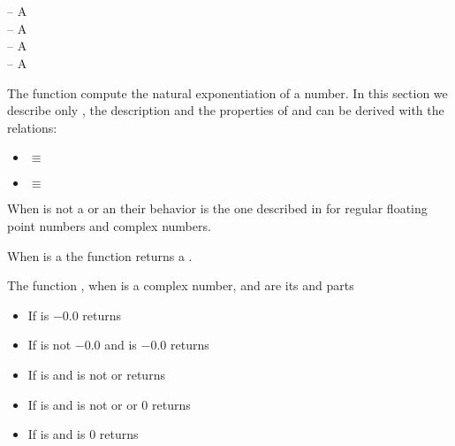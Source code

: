 \documentclass[../Exponentials-Logarithms-Trigonometry.tex]{subfiles}
\begin{document}

\DSyntax{}

  \RArrow {}\\
   \RArrow {}\\
  \RArrow {}

\DArgsNValues{}

 -- A \\
 -- A \\
 -- A \\
 -- A 

\DDescription{}

The function  compute the natural exponentiation of a number. In
this section we describe only , the description and the properties
of  and  can be derived with the relations:
\begin{itemize}
\item {}  \code{)} $\equiv$ 
  \code{)}  \code{))}
\item {} \code{)} $\equiv$  
  \code{))}
\end{itemize}


When  is not a  or an
 their behavior is the one described in
\cite{1996:ANSIHyperSpec} for regular floating point numbers and complex
numbers.

\noindent
When  is a  the function  returns a
.

\noindent
The function , when  is a complex number, 
and  are its  and  parts
\begin{itemize}
\item If  is $-0.0$ returns 
  \code{))}
\item If  is not $-0.0$ and  is
  $-0.0$ returns  
\item If  is  and
   is not  or 
  returns \code{)))}
\item If  is  and
   is not  or  or $0$
  returns \code{)))}
\item If  is  and  is $0$
  returns 
\end{itemize}
\end{document}
